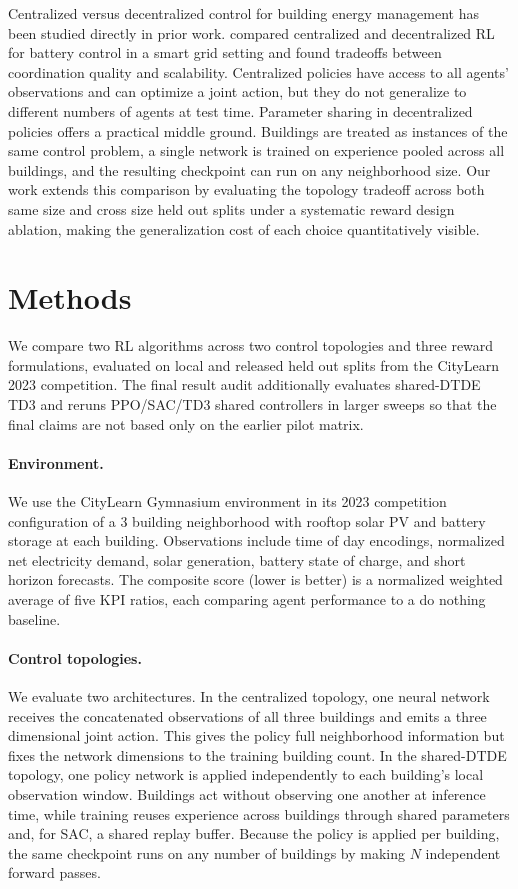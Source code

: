 \documentclass{article}
\begin{document}
Centralized versus decentralized control for building energy management has been studied directly in prior work. \citet{kathirgamanathan2021centralised} compared centralized and decentralized RL for battery control in a smart grid setting and found tradeoffs between coordination quality and scalability. Centralized policies have access to all agents' observations and can optimize a joint action, but they do not generalize to different numbers of agents at test time. Parameter sharing in decentralized policies offers a practical middle ground. Buildings are treated as instances of the same control problem, a single network is trained on experience pooled across all buildings, and the resulting checkpoint can run on any neighborhood size. Our work extends this comparison by evaluating the topology tradeoff across both same size and cross size held out splits under a systematic reward design ablation, making the generalization cost of each choice quantitatively visible.

\section{Methods}\label{sec:methods}

We compare two RL algorithms across two control topologies and three reward formulations, evaluated on local and released held out splits from the CityLearn 2023 competition. The final result audit additionally evaluates shared-DTDE TD3 and reruns PPO/SAC/TD3 shared controllers in larger sweeps so that the final claims are not based only on the earlier pilot matrix.

\paragraph{Environment.} We use the CityLearn Gymnasium environment \citep{vazquez2020citylearn, citylearnrepo} in its 2023 competition configuration of a 3 building neighborhood with rooftop solar PV and battery storage at each building. Observations include time of day encodings, normalized net electricity demand, solar generation, battery state of charge, and short horizon forecasts. The composite score (lower is better) is a normalized weighted average of five KPI ratios, each comparing agent performance to a do nothing baseline.

\paragraph{Control topologies.} We evaluate two architectures. In the centralized topology, one neural network receives the concatenated observations of all three buildings and emits a three dimensional joint action. This gives the policy full neighborhood information but fixes the network dimensions to the training building count. In the shared-DTDE topology, one policy network is applied independently to each building's local observation window. Buildings act without observing one another at inference time, while training reuses experience across buildings through shared parameters and, for SAC, a shared replay buffer. Because the policy is applied per building, the same checkpoint runs on any number of buildings by making $N$ independent forward passes.
\end{document}
